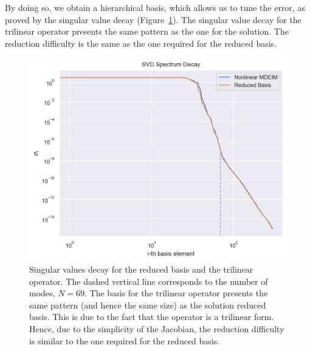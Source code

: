 \documentclass[../../thesis.tex]{subfiles}
\begin{document}
By doing so, we obtain a hierarchical basis, which allows us to tune the error,
as proved by the singular value decay (Figure~\ref{fig:sigmas_decay_from_fom}).
The singular value decay for the trilinear operator presents the same pattern 
as the one for the solution.
The reduction difficulty is the same as the one
required for the reduced basis.
\begin{figure}[h]
    \centering
    \includegraphics[width=1\columnwidth]{research_project/piston/figures/mdeim_certification/sigmas_problem_from_fom.png}
    \caption{Singular values decay for the reduced basis and the trilinear operator.
    The dashed vertical line corresponds to the number of modes, $N=69$.
    The basis for the trilinear operator presents the same pattern 
    (and hence the same size)
    as the solution reduced basis.
    This is due to the fact that the operator is a trilinear form.
    Hence, due to the simplicity of the Jacobian, the reduction difficulty is similar to the one
    required for the reduced basis.}
    \label{fig:sigmas_decay_from_fom}
\end{figure}
\end{document}
